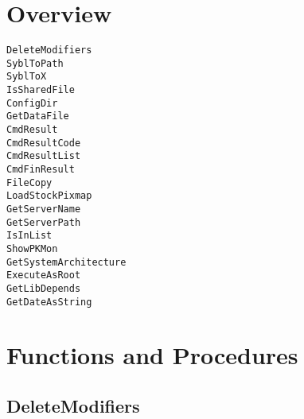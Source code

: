 \documentclass{report}
\newif\ifpdf
\begin{document}
\section{Overview}
\begin{description}
\item[\texttt{DeleteModifiers}]
\item[\texttt{SyblToPath}]
\item[\texttt{SyblToX}]
\item[\texttt{IsSharedFile}]
\item[\texttt{ConfigDir}]
\item[\texttt{GetDataFile}]
\item[\texttt{CmdResult}]
\item[\texttt{CmdResultCode}]
\item[\texttt{CmdResultList}]
\item[\texttt{CmdFinResult}]
\item[\texttt{FileCopy}]
\item[\texttt{LoadStockPixmap}]
\item[\texttt{GetServerName}]
\item[\texttt{GetServerPath}]
\item[\texttt{IsInList}]
\item[\texttt{ShowPKMon}]
\item[\texttt{GetSystemArchitecture}]
\item[\texttt{ExecuteAsRoot}]
\item[\texttt{GetLibDepends}]
\item[\texttt{GetDateAsString}]
\end{description}
\section{Functions and Procedures}
\ifpdf
\subsection*{\large{\textbf{DeleteModifiers}}\normalsize\hspace{1ex}\hrulefill}
\else
\end{document}
